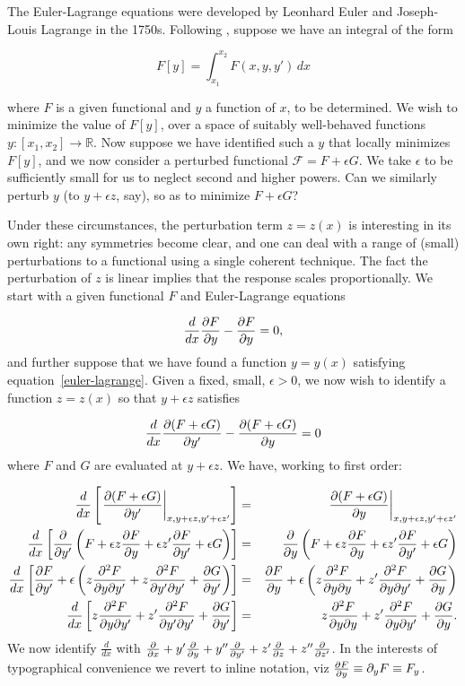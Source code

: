 \documentclass[pdflatex,sn-mathphys-num]{sn-jnl}%
\theoremstyle{thmstyleone}%
\theoremstyle{thmstyletwo}%
\theoremstyle{thmstylethree}%
\begin{document}
The Euler-Lagrange equations were developed by Leonhard Euler and
Joseph-Louis Lagrange in the 1750s.  Following \citep{jeffreys1972},
suppose we have an integral of the form

\begin{equation}
F[y] = \int_{x_1}^{x_2} F(x,y,y')\,dx
\end{equation}

\noindent where $F$ is a given functional and $y$ a function of $x$,
to be determined.  We wish to minimize the value of $F[y]$, over a
space of suitably well-behaved functions
$y\colon\left[x_1,x_2\right]\longrightarrow\mathbb{R}$.  Now suppose
we have identified such a $y$ that locally minimizes $F[y]$, and we
now consider a perturbed functional $\mathcal{F}=F+\epsilon G$.  We
take $\epsilon$ to be sufficiently small for us to neglect second and
higher powers.  Can we similarly perturb $y$ (to $y+\epsilon z$, say),
so as to minimize $F+\epsilon G$?

Under these circumstances, the perturbation term $z=z(x)$ is
interesting in its own right: any symmetries become clear, and one can
deal with a range of (small) perturbations to a functional using a
single coherent technique.  The fact the perturbation of $z$ is linear
implies that the response scales proportionally.  We start with a
given functional $F$ and Euler-Lagrange equations

\begin{equation}\label{euler-lagrange}
  \frac{d}{dx}\frac{\partial{F}}{\partial{y}}-\frac{\partial{F}}{\partial{y}} = 0,
\end{equation}
%
and further suppose that we have found a function $y=y(x)$ satisfying
equation~\ref{euler-lagrange}.  Given a fixed, small, $\epsilon>0$, we
now wish to identify a function $z=z(x)$ so that $y+\epsilon z$
satisfies

\begin{equation}
  \frac{d}{dx}\frac{\partial{(F+\epsilon G)}}{\partial{y'}}-\frac{\partial{(F+\epsilon G)}}{\partial{y}} = 0
\end{equation}
%
where $F$ and $G$ are evaluated at $y+\epsilon z$.  We have, working
to first order:

\begin{eqnarray}
\frac{d}{dx}\left[\left.\frac{\partial{(F+\epsilon G)}}{\partial{y'}}\right|_{x,y+\epsilon z,y'+\epsilon z'}\right]
&=& \left.\frac{\partial{(F+\epsilon G)}}{\partial{y}}\right|_{x,y+\epsilon z,y'+\epsilon z'}\nonumber\\
\frac{d}{dx}\left[\frac{\partial{}}{\partial{y'}}\left(F + \epsilon z\frac{\partial{F}}{\partial{y}} + \epsilon z'\frac{\partial{F}}{\partial{y'}}+\epsilon G\right)\right]
&=& \frac{\partial{}}{\partial{y}}\left(F + \epsilon z\frac{\partial{F}}{\partial{y}} + \epsilon z'\frac{\partial{F}}{\partial{y'}}+\epsilon G\right)\nonumber\\
\frac{d}{dx}\left[\frac{\partial{F}}{\partial{y'}} + \epsilon\left(z\frac{\partial^2{F}}{\partial{y}\partial{y'}} + z\frac{\partial^2{F}}{\partial{y'}\partial{y'}} + \frac{\partial{G}}{\partial{y'}}\right)\right]
&=& \frac{\partial{F}}{\partial{y}} + \epsilon\left(z\frac{\partial^2{F}}{\partial{y}\partial{y}} + z'\frac{\partial^2{F}}{\partial{y}\partial{y'}} + \frac{\partial{G}}{\partial{y}}\right)\nonumber\\
\frac{d}{dx}\left[z\frac{\partial^2{F}}{\partial{y}\partial{y'}} + z'\frac{\partial^2{F}}{\partial{y'}\partial{y'}} + \frac{\partial{G}}{\partial{y'}}\right]
&=& z\frac{\partial^2{F}}{\partial{y}\partial{y}} + z'\frac{\partial^2{F}}{\partial{y}\partial{y'}} + \frac{\partial{G}}{\partial{y}}.
\end{eqnarray}
%
We now identify $\frac{d}{dx}$ with $\frac{\partial{}}{\partial{x}} + y'\frac{\partial{}}{\partial{y}} +
y''\frac{\partial{}}{\partial{y'}} + z'\frac{\partial{}}{\partial{z}} + z''\frac{\partial{}}{\partial{z'}}$.  In the interests of
typographical convenience we revert to inline notation, viz
$\frac{\partial{F}}{\partial{y}}\equiv\partial_yF\equiv F_y$.
\end{document}
